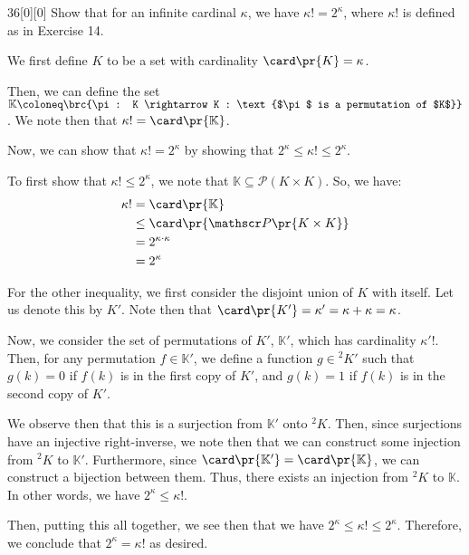 \documentclass{article}
\begin{document}
\begin{hw}{36}[0][0]
	Show that for an infinite cardinal $\kappa$, we have $\kappa ! = 2^{\kappa}$, where $\kappa!$ is defined as in Exercise 14. 
\end{hw}
\begin{solution}
	We first define $K$ to be a set with cardinality $\card \pr{K} = \kappa$.
	
	Then, we can define the set $\mathbb K \coloneq \brc{\pi : K \rightarrow K : \text{$\pi$ is a permutation of $K$}}$. We note then that $\kappa ! = \card \pr{\mathbb K}$.
	
	Now, we can show that $\kappa ! = 2^{\kappa}$ by showing that $2^{\kappa} \leq \kappa ! \leq 2^{\kappa}$.
	
	To first show that $\kappa ! \leq 2^{\kappa}$, we note that $\mathbb K \subseteq \mathscr P (K \times K)$. So, we have:
	\begin{align*}
		\kappa! &= \card \pr{\mathbb K} \\
		&\leq \card \pr{\mathscr P \pr{K \times K}} \\
		&= 2^{\kappa \cdot \kappa} \\
		&= 2^{\kappa}
	\end{align*}

	For the other inequality, we first consider the disjoint union of $K$ with itself. Let us denote this by $K'$. Note then that $\card \pr{K'} = \kappa' = \kappa + \kappa = \kappa$.
	
	Now, we consider the set of permutations of $K'$, $\mathbb K'$, which has cardinality $\kappa' !$. Then, for any permutation $f \in \mathbb K'$, we define a function $g \in {}^{2}K'$ such that $g(k) = 0$ if $f(k)$ is in the first copy of $K'$, and $g(k) = 1$ if $f(k)$ is in the second copy of $K'$.
	
	We observe then that this is a surjection from $\mathbb K'$ onto ${}^{2}K$. Then, since surjections have an injective right-inverse, we note then that we can construct some injection from ${}^{2}K$ to $\mathbb K'$. Furthermore, since $\card \pr{\mathbb K'} = \card \pr{\mathbb K}$, we can construct a bijection between them. Thus, there exists an injection from ${}^{2}K$ to $\mathbb K$. In other words, we have $2^{\kappa} \leq \kappa !$.
	
	Then, putting this all together, we see then that we have $2^{\kappa} \leq \kappa ! \leq 2^{\kappa}$. Therefore, we conclude that $2^{\kappa} = \kappa !$ as desired.
\end{solution}
\end{document}
